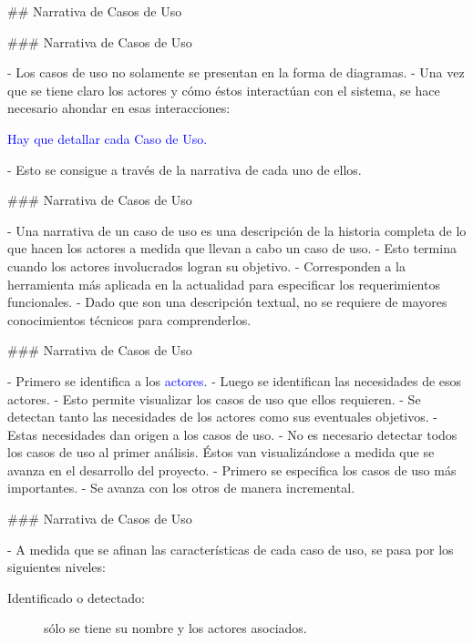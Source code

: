 ## Narrativa de Casos de Uso

### Narrativa de Casos de Uso

- Los casos de uso no solamente se presentan en la forma de diagramas.
- Una vez que se tiene claro los actores y cómo éstos interactúan con el sistema, se hace
necesario ahondar en esas interacciones:

\begin{rboxx}{}
    \textcolor{blue}{Hay que detallar cada Caso de Uso.}
\end{rboxx}

- Esto se consigue a través de la narrativa de cada uno de ellos.

### Narrativa de Casos de Uso

\newline

- Una narrativa de un caso de uso es una descripción de la historia completa de lo que hacen los actores
a medida que llevan a cabo un caso de uso.
    - Esto termina cuando los actores involucrados logran su objetivo.
- Corresponden a la herramienta más aplicada en la actualidad para especificar los requerimientos funcionales.
- Dado que son una descripción textual, no se requiere de mayores conocimientos técnicos para comprenderlos.

### Narrativa de Casos de Uso

\newline

- Primero se identifica a los \textcolor{blue}{actores}.
- Luego se identifican las necesidades de esos actores.
    - Esto permite visualizar los casos de uso que ellos requieren.
    - Se detectan tanto las necesidades de los actores como sus eventuales objetivos.
- Estas necesidades dan origen a los casos de uso.
- No es necesario detectar todos los casos de uso al primer análisis. Éstos van visualizándose
a medida que se avanza en el desarrollo del proyecto.
    - Primero se especifica los casos de uso más importantes.
    - Se avanza con los otros de manera incremental.

### Narrativa de Casos de Uso

\newline

- A medida que se afinan las características de cada caso de uso, se pasa por los siguientes
niveles:

\begin{rboxx}[100mm]{}
\begin{description}
    \item[Identificado o detectado:] sólo se tiene su nombre y los actores asociados.
\end{description}
\end{rboxx}

